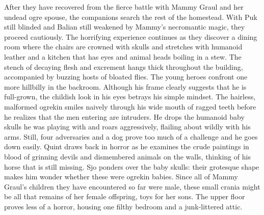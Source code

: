 After they have recovered from the fierce battle with Mammy Graul and her undead ogre spouse, the companions search the rest of the homestead. With Puk still blinded and Balian still weakened by Mammy's necromantic magic, they proceed cautiously. The horrifying experience continues as they discover a dining room where the chairs are crowned with skulls and stretches with humanoid leather and a kitchen that has eyes and animal heads boiling in a stew. The stench of decaying flesh and excrement hangs thick throughout the building, accompanied by buzzing hosts of bloated flies. The young heroes confront one more hillbilly in the backroom. Although his frame clearly suggests that he is full-grown, the childish look in his eyes betrays his simple mindset. The hairless, malformed ogrekin smiles naively through his wide mouth of ragged teeth before he realizes that the men entering are intruders. He drops the humanoid baby skulls he was playing with and roars aggressively, flailing about wildly with his arms. Still, four adversaries and a dog prove too much of a challenge and he goes down easily. Quint draws back in horror as he examines the crude paintings in blood of grinning devils and dismembered animals on the walls, thinking of his horse that is still missing. Sjo ponders over the baby skulls: their grotesque shape makes him wonder whether these were ogrekin babies. Since all of Mammy Graul's children they have encountered so far were male, these small crania might be all that remains of her female offspring, toys for her sons. The upper floor proves less of a horror, housing one filthy bedroom and a junk-littered attic.\\

